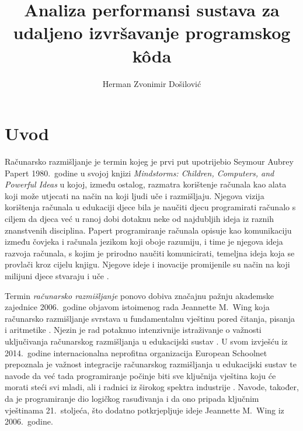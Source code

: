 \documentclass[times, utf8, diplomski]{fer}
\begin{document}

\title{Analiza performansi sustava za udaljeno izvršavanje programskog kôda}

\author{Herman Zvonimir Došilović}

\maketitle



\zahvala{}

\tableofcontents

\chapter{Uvod}
Računarsko razmišljanje  je termin kojeg je prvi put upotrijebio Seymour Aubrey Papert 1980.\ godine u svojoj knjizi \textit{Mindstorms: Children, Computers, and Powerful Ideas} \citep{10.5555/1095592} u kojoj, između ostalog, razmatra korištenje računala kao alata koji može utjecati na način na koji ljudi uče i razmišljaju. Njegova vizija korištenja računala u edukaciji djece bila je naučiti djecu programirati računalo s ciljem da djeca već u ranoj dobi dotaknu neke od najdubljih ideja iz raznih znanstvenih disciplina. Papert programiranje računala opisuje kao komunikaciju između čovjeka i računala jezikom koji oboje razumiju, i time je njegova ideja razvoja računala, s kojim je prirodno naučiti  komunicirati, temeljna ideja koja se provlači kroz cijelu knjigu. Njegove ideje i inovacije promijenile su način na koji milijuni djece stvaraju i uče \citep{Papert.MITMediaLab}.

Termin \textit{računarsko razmišljanje} ponovo dobiva značajnu pažnju akademske zajednice \citep{grover2013computational} 2006.\ godine objavom istoimenog rada Jeannette M.\ Wing  koja računarsko razmišljanje svrstava u fundamentalnu vještinu pored čitanja, pisanja i aritmetike \citep{wing2006computational}. Njezin je rad potaknuo intenzivnije istraživanje o važnosti uključivanja računarskog razmišljanja u edukacijski sustav \citep{lockwood2017computational}. U svom izvješću iz 2014.\ godine internacionalna neprofitna organizacija European Schoolnet prepoznala je važnost integracije računarskog razmišljanja u edukacijski sustav te navode da već tada programiranje počinje biti sve ključnija vještina koju će morati steći svi mladi, ali i radnici iz širokog spektra industrije \citep{balanskat2014computing}. Navode, također, da je programiranje dio logičkog rasuđivanja i da ono pripada ključnim vještinama 21.\ stoljeća, što dodatno potkrjepljuje ideje Jeannette M.\ Wing iz 2006.\ godine.
\end{document}
